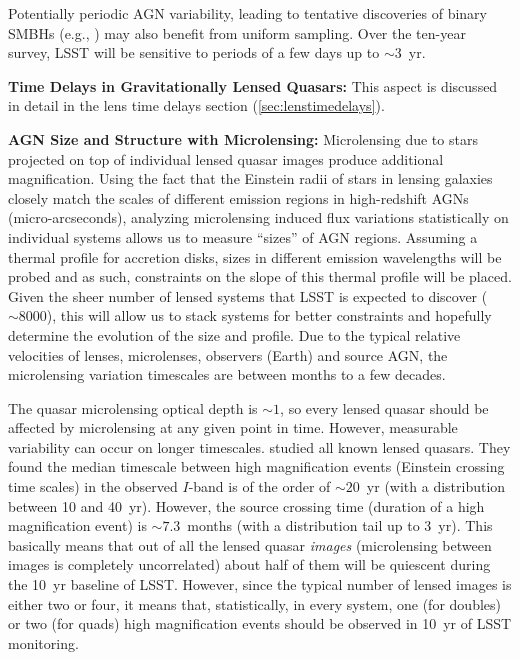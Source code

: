 Potentially periodic AGN variability, leading to tentative discoveries
of binary SMBHs (e.g., \citet{GrahamEtal2015}) may also benefit from
uniform sampling. Over the ten-year survey, LSST will be sensitive
to periods of a few days up to $\sim3$~yr.

{\bf Time Delays in Gravitationally Lensed Quasars:} This aspect is
discussed in detail in the lens time delays section
(\autoref{sec:lenstimedelays}).

{\bf AGN Size and Structure with Microlensing:} Microlensing due to
stars projected on top of individual lensed quasar images produce
additional magnification. Using the fact that the Einstein radii of
stars in lensing galaxies closely match the scales of different
emission regions in high-redshift AGNs (micro-arcseconds), analyzing
microlensing induced flux variations statistically on individual
systems allows us to measure ``sizes'' of AGN regions.
%
Assuming a thermal profile for accretion disks, sizes in different
emission wavelengths will be probed and as such, constraints on the
slope of this thermal profile will be placed. Given the sheer number
of lensed systems that LSST is expected to discover ($\sim8000$),
this will allow us to stack systems for better constraints and
hopefully determine the evolution of the size and profile. Due to the
typical relative velocities of lenses, microlenses, observers (Earth)
and source AGN, the microlensing variation timescales are between
months to a few decades.

The quasar microlensing optical depth is $\sim1$, so every lensed
quasar should be affected by microlensing at any given point in time.
However, measurable variability can occur on longer timescales.
\citet{MosqueraandKochanek2011} studied all known lensed quasars.
They found the median timescale between high magnification events
(Einstein crossing time scales) in the observed $I$-band is of the
order of $\sim20$~yr (with a distribution between 10 and 40~yr).
However, the source crossing time (duration of a high magnification
event) is $\sim7.3$~months (with a distribution tail up to 3~yr).
This basically means that out of all the lensed quasar {\em images}
(microlensing between images is completely uncorrelated) about half
of them will be quiescent during the 10~yr baseline of LSST. However,
since the typical number of lensed images is either two or four, it
means that, statistically, in every system, one (for doubles) or two
(for quads) high magnification events should be observed in 10~yr of
LSST monitoring.

